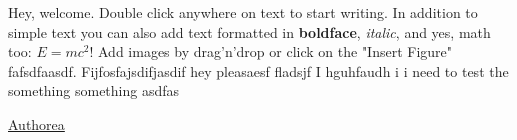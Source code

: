 Hey, welcome. Double click anywhere on  text to start writing. In addition to simple text you can also add text formatted in \textbf{boldface}, \textit{italic}, and yes, math too: $E  =  mc^{2}$! Add images by drag'n'drop or click on the "Insert Figure" fafsdfaasdf. Fijfosfajsdifjasdif hey pleasaesf fladsjf I hguhfaudh i i need to test the something something 
asdfas

\def\authorea{\href{http://en.wikipedia.org/wiki/Authorea}{Authorea}\xspace}
\def\latexml{\href{https://en.wikipedia.org/wiki/LaTeXML}{LaTeXML}\xspace}
\def\latex{\href{https://en.wikipedia.org/wiki/LaTeX}{\LaTeX}\xspace}

\authorea